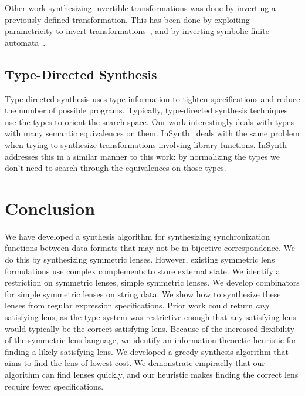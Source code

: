 \documentclass[acmsmall,screen,anonymous]{acmart}
\begin{document}
Other work synthesizing invertible transformations was done by inverting a
previously defined transformation.  This has been done by exploiting
parametricity to invert transformations~\cite{?}, and by inverting symbolic
finite automata~\cite{?}.

\subsection{Type-Directed Synthesis}

Type-directed synthesis uses type information to tighten specifications and
reduce the number of possible programs. Typically, type-directed synthesis
techniques use the types to orient the search space.  Our work interestingly
deals with types with many semantic equivalences on them. InSynth~\cite{?}
deals with the same problem when trying to synthesize transformations involving
library functions. InSynth addresses this in a similar manner to this work: by
normalizing the types we don't need to search through the equivalences on those
types.


\section{Conclusion}
\label{sec:conc}
We have developed a synthesis algorithm for synthesizing synchronization
functions between data formats that may not be in bijective correspondence. We
do this by synthesizing symmetric lenses. However, existing symmetric lens
formulations use complex complements to store external state. We identify a
restriction on symmetric lenses, simple symmetric lenses. We develop combinators
for simple symmetric lenses on string data. We show how to synthesize these
lenses from regular expression specifications. Prior work could return
\emph{any} satisfying lens, as the type system was restrictive enough that any
satisfying lens would typically be the correct satisfying lens. Because of the
increased flexibility of the symmetric lens language, we identify an
information-theoretic heuristic for finding a likely satisfying lens. We
developed a greedy synthesis algorithm that aims to find the lens of lowest
cost. We demonstrate empiraclly that our algorithm can find lenses quickly, and
our heuristic makes finding the correct lens require fewer specifications.


\begin{acks}
\end{acks}
\end{document}
